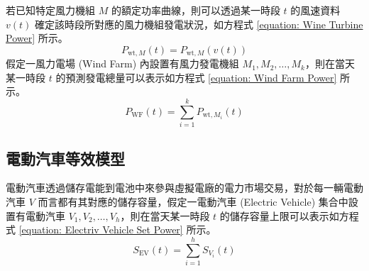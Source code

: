若已知特定風力機組 $M$ 的額定功率曲線，則可以透過某一時段 $t$ 的風速資料 $v(t)$ 確定該時段所對應的風力機組發電狀況，如方程式 \eqref{equation: Wine Turbine Power} 所示。
%
\begin{equation}\label{equation: Wine Turbine Power}
  P_{\text{wt},M} (t) = P_{\text{wt},M} (v (t))
\end{equation}
%
假定一風力電場 (Wind Farm) 內設置有風力發電機組 $M_{1}, M_{2}, \dots, M_{k}$，則在當天某一時段 $t$ 的預測發電總量可以表示如方程式 \eqref{equation: Wind Farm Power} 所示。
%
\begin{equation}\label{equation: Wind Farm Power}
  P_{\text{WF}}(t) = \sum_{i = 1}^{k} P_{\text{wt}, M_i} (t)
\end{equation}

\subsection{電動汽車等效模型}

電動汽車透過儲存電能到電池中來參與虛擬電廠的電力市場交易，對於每一輛電動汽車 $V$ 而言都有其對應的儲存容量，假定一電動汽車 (Electric Vehicle) 集合中設置有電動汽車 $V_{1}, V_{2}, \dots, V_{h}$，則在當天某一時段 $t$ 的儲存容量上限可以表示如方程式 \eqref{equation: Electriv Vehicle Set Power} 所示。
%
\begin{equation}\label{equation: Electriv Vehicle Set Power}
  S_{\text{EV}}(t) = \sum_{i = 1}^{h} S_{V_i} (t)
\end{equation}

